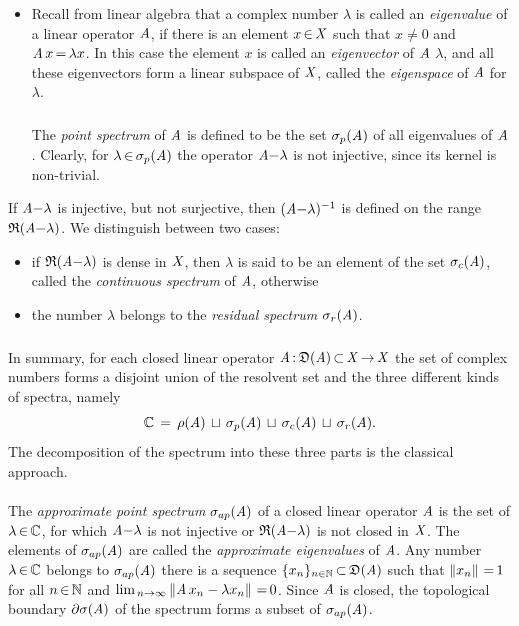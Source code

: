 \documentclass[11pt,twoside]{article}
\begin{document}
\begin{itemize}[leftmargin=4mm,itemsep=5pt]
\item[1.]
Recall from linear algebra
that a complex number $\lambda$ is called an \textit{eigenvalue}
of a linear operator $\mathit{A}$,
if there is an element $x {\,\in\,} \mathit{X}$ such that
$x \neq 0$ and $\mathit{A} \,x {\,=\,} \lambda x$.
In this case the element $x$ is called an \textit{eigenvector} of $\mathit{A}$
{\wrt} $\lambda$,
and all these eigenvectors form a linear subspace of $\mathit{X}$,
called the \textit{eigenspace} of $\mathit{A}$ for $\lambda$.

\subparagraph{} %
The \textit{point spectrum} of $\mathit{A}$ is defined to be
the set $\sigma_p(\mathit{A})$ of all eigen\-values of $\mathit{A}$.
Clearly,
for $\lambda {\,\in\,} \sigma_p(\mathit{A})$ the operator
$\mathit{A} {-} \lambda$ is not injective,
since its kernel is non-trivial.
\end{itemize}

If $\mathit{A} {-} \lambda$ is injective,
but not surjective,
then $(\mathit{A} {-} \lambda)^{-1}$ is defined on the range $\mathfrak{R}(\mathit{A} {-} \lambda)$.
We distinguish between two cases:

\begin{itemize}[leftmargin=4mm]
\item[2.]
if $\mathfrak{R}(\mathit{A} {-} \lambda)$ is dense in $\mathit{X}$,
then $\lambda$ is said to be an element of the set $\sigma_c(\mathit{A})$,
called the \textit{continuous spectrum} of $\mathit{A}$,
otherwise

\item[3.]
the number $\lambda$ belongs to the \textit{residual spectrum}
$\sigma_r(\mathit{A})$.
\end{itemize}

\subparagraph{}
In summary,
for each closed linear operator
$\mathit{A} {\,:\,} \mathfrak{D}(\mathit{A}) {\,\subset\,} \mathit{X} {\,\to\,} \mathit{X}$
the set of complex numbers forms a disjoint union
of the resolvent set and the three different kinds of spectra, namely
\[
{\mathbb{C}} \,=\, \rho    (\mathit{A}) \, \sqcup
        \, \sigma_p(\mathit{A}) \, \sqcup
        \, \sigma_c(\mathit{A}) \, \sqcup
        \, \sigma_r(\mathit{A}).
\]
The decomposition of the spectrum into these three parts
is the classical approach.

\paragraph{} %
The \textit{approximate point spectrum} $\sigma_{ap}(\mathit{A})$
of a closed linear operator $\mathit{A}$ is the set of $\lambda {\,\in\,} {\mathbb{C}}$,
for which $\mathit{A} {-} \lambda$ is not injective
or $\mathfrak{R}(\mathit{A} {-} \lambda)$ is not closed in $\mathit{X}$.
The elements of $\sigma_{ap}(\mathit{A})$ are called
the \textit{approximate eigenvalues} of $\mathit{A}$.
Any number $\lambda {\,\in\,} {\mathbb{C}}$ belongs to $\sigma_{ap}(\mathit{A})$
\iff
there is a sequence $\{x_n\}_{n \in {\mathbb{N}}} {\,\subset\,} \mathfrak{D}(\mathit{A})$ such that
$\left\lVert x_n \right\rVert {\,=\,} 1$ for all $n {\,\in\,} {\mathbb{N}}$ and
$\lim_{\,n \to \infty} \left\lVert \mathit{A} \,x_n - \lambda x_n \right\rVert {\,=\,} 0$.
Since $\mathit{A}$ is closed,
the topological boundary $\partial \sigma(\mathit{A})$ of the spectrum
forms a subset of $\sigma_{ap}(\mathit{A})$.
\end{document}
